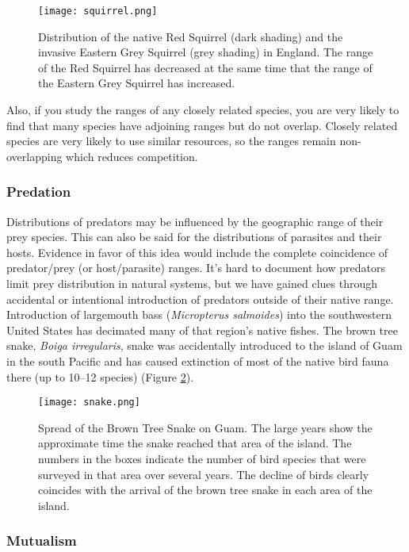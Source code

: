 \documentclass[12pt, oneside]{article}   	%
\begin{document}
\begin{figure}[hb]
	\centering
	\texttt{[image: squirrel.png]}
	\caption{Distribution of the native Red Squirrel (dark shading) and the invasive Eastern Grey Squirrel (grey shading) in England. The range of the Red Squirrel has decreased at the same time that the range of the Eastern Grey Squirrel has increased.\label{squirrel}}
\end{figure}

Also, if you study the ranges of any closely related species, you are very likely to find that many species have adjoining ranges but do not overlap.  Closely related species are very likely to use similar resources, so the ranges remain non-overlapping which reduces competition. 

\subsubsection{Predation}
Distributions of predators may be influenced by the geographic range of their prey species. This can also be said for the distributions of parasites and their hosts. Evidence in favor of this idea would include the complete coincidence of predator/prey (or host/parasite) ranges. It's hard to document how predators limit prey distribution in natural systems, but we have gained clues through accidental or intentional introduction of predators outside of their native range. Introduction of largemouth bass (\emph{Micropterus salmoides}) into the southwestern United States has decimated many of that region's native fishes.  The brown tree snake, \emph{Boiga irregularis}, snake was accidentally introduced  to the island of Guam in the south Pacific and has caused extinction of most of the native bird fauna there (up to 10--12 species) (Figure \ref{brown tree snake}). 

\begin{figure}
	\centering
	\texttt{[image: snake.png]}
	\caption{Spread of the Brown Tree Snake on Guam. The large years show the approximate time the snake reached that area of the island. The numbers in the boxes indicate the number of bird species that were surveyed in that area over several years. The decline of birds clearly coincides with the arrival of the brown tree snake in each area of the island.\label{brown tree snake}}
\end{figure}


\subsubsection{Mutualism}
\end{document}
